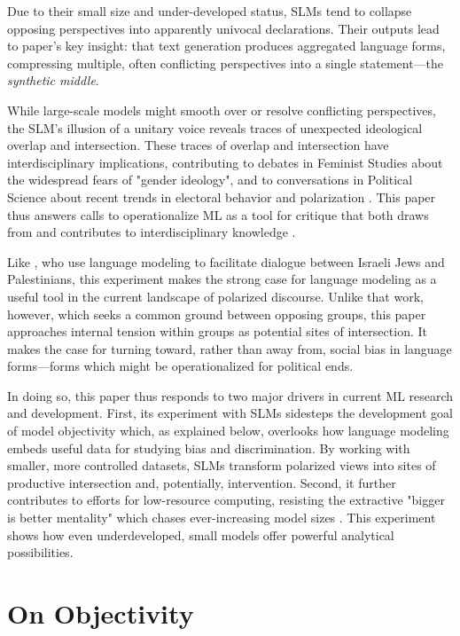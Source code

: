 \documentclass[letterpaper]{article} %
\begin{document}
Due to their small size and under-developed status, SLMs tend to collapse opposing perspectives into apparently univocal declarations. Their outputs lead to paper's key insight: that text generation produces aggregated language forms, compressing multiple, often conflicting perspectives into a single statement---the \textit{synthetic middle}. 

While large-scale models might smooth over or resolve conflicting perspectives, the SLM's illusion of a unitary voice reveals traces of unexpected ideological overlap and intersection. These traces of overlap and intersection have interdisciplinary implications, contributing to debates in Feminist Studies about the widespread fears of "gender ideology", and to conversations in Political Science about recent trends in electoral behavior and polarization \citep{butler_2024,bornschier_2021}. This paper thus answers calls to operationalize ML as a tool for critique that both draws from and contributes to interdisciplinary knowledge \citep{wanga_2025,birhane_2022,devinney_2022}.

Like \citet{konya_2025}, who use language modeling to facilitate dialogue between Israeli Jews and Palestinians, this experiment makes the strong case for language modeling as a useful tool in the current landscape of polarized discourse. Unlike that work, however, which seeks a common ground between opposing groups, this paper approaches internal tension within groups as potential sites of intersection. It makes the case for turning toward, rather than away from, social bias in language forms---forms which might be operationalized for political ends. 

In doing so, this paper thus responds to two major drivers in current ML research and development. First, its experiment with SLMs sidesteps the development goal of model objectivity which, as explained below, overlooks how language modeling embeds useful data for studying bias and discrimination. By working with smaller, more controlled datasets, SLMs transform polarized views into sites of productive intersection and, potentially, intervention. Second, it further contributes to efforts for low-resource computing, resisting the extractive "bigger is better mentality" which chases ever-increasing model sizes \citep{varoquaux_2025}. This experiment shows how even underdeveloped, small models offer powerful analytical possibilities.

\section{On Objectivity}
\end{document}
